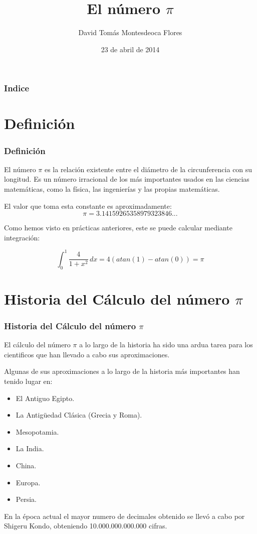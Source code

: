 \documentclass{beamer}
\title[Prensentación sobre $\pi$ en Beamer]{El número $\pi$}
\author[D. Montesdeoca]{David Tomás Montesdeoca Flores}
\date[23/04/14]{23 de abril de 2014}
\begin{document}
\begin{frame}
\titlepage
\end{frame}

\begin{frame}
\frametitle{Indice}
\tableofcontents[pausesections]

\end{frame}

\section{Definición}

\begin{frame}
\frametitle{Definición}
El número $\pi$ es la relación existente entre el diámetro de la circunferencia con su longitud.
Es un número irracional de los más importantes usados en las ciencias matemáticas, como la física, las ingenierías y las propias matemáticas.

El valor que toma esta constante es aproximadamente:
 $$\pi = 3.14159265358979323846...$$ 

Como hemos visto en prácticas anteriores, este se puede calcular mediante integración:

$$\int_{0}^{1} \! \frac{4}{1+x^2}\, dx = 4(atan(1) -atan(0)) = \pi $$
\end{frame}

\section{Historia del Cálculo del número $\pi$}

\begin{frame}
\frametitle{Historia del Cálculo del número $\pi$}
El cálculo del número $\pi$ a lo largo de la historia ha sido una ardua tarea para los cientificos que han llevado a cabo sus aproximaciones.

Algunas de sus aproximaciones a lo largo de la historia más importantes han tenido lugar en:

\begin{itemize}
  \item El Antiguo Egipto.
  \pause
  \item La Antigüedad Clásica (Grecia y Roma).
  \pause
  \item Mesopotamia.
  \pause
  \item La India.
  \pause
  \item China.
  \pause
  \item Europa.
  \pause
  \item Persia.
  \pause
\end{itemize}

En la época actual el mayor numero de decimales obtenido se llevó  a cabo por Shigeru Kondo, obteniendo 10.000.000.000.000 cifras.

\end{frame}
\end{document}
